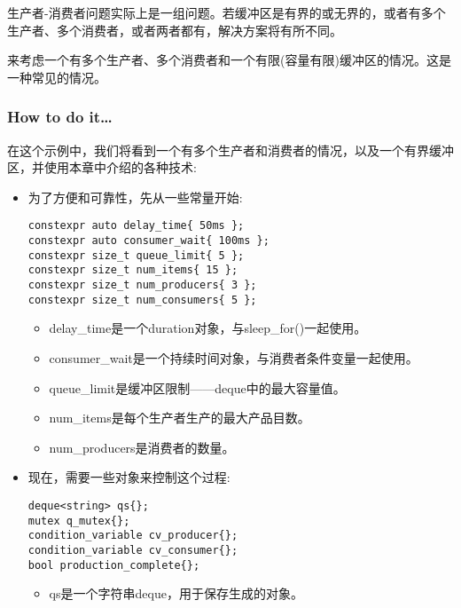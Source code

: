 
生产者-消费者问题实际上是一组问题。若缓冲区是有界的或无界的，或者有多个生产者、多个消费者，或者两者都有，解决方案将有所不同。

来考虑一个有多个生产者、多个消费者和一个有限(容量有限)缓冲区的情况。这是一种常见的情况。

\subsubsection{How to do it…}

在这个示例中，我们将看到一个有多个生产者和消费者的情况，以及一个有界缓冲区，并使用本章中介绍的各种技术:

\begin{itemize}
\item 
为了方便和可靠性，先从一些常量开始:

\begin{lstlisting}[style=styleCXX]
constexpr auto delay_time{ 50ms };
constexpr auto consumer_wait{ 100ms };
constexpr size_t queue_limit{ 5 };
constexpr size_t num_items{ 15 };
constexpr size_t num_producers{ 3 };
constexpr size_t num_consumers{ 5 };
\end{lstlisting}

\begin{itemize}
\item
delay\_time是一个duration对象，与sleep\_for()一起使用。

\item 
consumer\_wait是一个持续时间对象，与消费者条件变量一起使用。

\item 
queue\_limit是缓冲区限制——deque中的最大容量值。

\item 
num\_items是每个生产者生产的最大产品目数。

\item 
num\_producers是消费者的数量。
\end{itemize}

\item 
现在，需要一些对象来控制这个过程:

\begin{lstlisting}[style=styleCXX]
deque<string> qs{};
mutex q_mutex{};
condition_variable cv_producer{};
condition_variable cv_consumer{};
bool production_complete{};
\end{lstlisting}

\begin{itemize}
\item 
qs是一个字符串deque，用于保存生成的对象。


\end{itemize}
\end{itemize}
